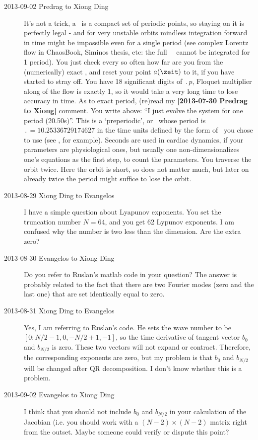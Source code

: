\begin{description}
\item[2013-09-02 Predrag to Xiong Ding] It's not a trick, a \po\ is a compact set
of periodic points, so staying on it is perfectly legal - and for very unstable orbits
mindless integration forward in time might be impossible even for a
single period (see complex Lorentz flow in ChaosBook, Siminos thesis, etc:
the full \statesp\ \reqv\ cannot be integrated for 1 period).
You just check every so often how far are
you from the (numerically) exact \po, and reset your point
$\ssp(\zeit)$ to it, if you have started to stray off.
You have 18 significant digits of $\period{p}$,
Floquet multiplier along of the flow is exactly 1, so it would take
a very long time to lose accuracy in time. As to exact period,
(re)read my {\bf [2013-07-30 Predrag to Xiong]} comment.
You write above:
``I just evolve the system for one period (20.50s)''. This is a
`preperiodic', or \rpo\ whose period is $\period{}=10.25336729174627$
in the time units defined by the form of \KSe\ you chose to use
(see , for example). Seconds are used in
cardiac dynamics, if your parameters are physiological ones, but
usually one non-dimensionalizes one's equations as the first
step, to count the parameters. You traverse the orbit twice. Here
the orbit is short, so does not matter much, but later on already
twice the period might suffice to lose the orbit.

\item[2013-08-29 Xiong Ding to Evangelos] I have a simple question about Lyapunov exponents.
You set the truncation number $N=64$, and you get 62 Lypunov exponents.
I am confused why the number is two less than the dimension. Are the extra zero?

\item[2013-08-30 Evangelos to Xiong Ding] Do you refer to Ruslan's matlab code
in your question? The answer is probably related to the fact that there are
two Fourier modes (zero and the last one) that are set identically equal to zero.

\item[2013-08-31 Xiong Ding to Evangelos] Yes, I am referring to Ruslan's code.
He sets the wave number to be $[0:N/2-1, 0, -N/2+1,-1]$,
so the time derivative of  tangent vector $b_0$ and $b_{N/2}$ is zero.
These two vectors will not expand or contract.
Therefore, the corresponding exponents are zero,
but my problem is that $b_0$ and $b_{N/2}$ will be changed after
QR decomposition. I don't know whether this is a problem.

\item[2013-09-02 Evangelos to Xiong Ding] I think that you should not include
$b_0$ and $b_{N/2}$ in your calculation of the Jacobian (i.e. you should work
with a $(N-2)\times (N-2)$ matrix right from the outset. Maybe someone could
verify or dispute this point?



\end{description}

